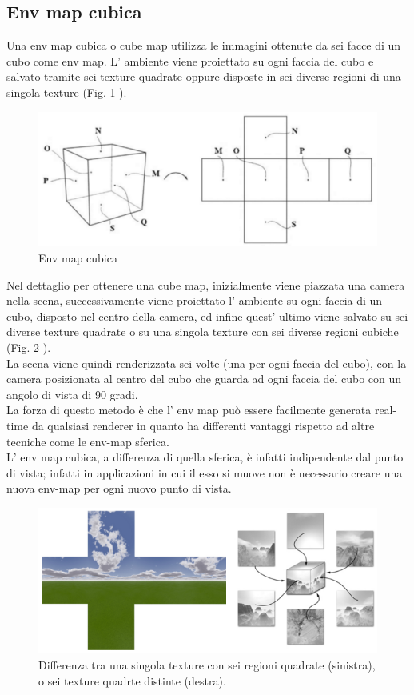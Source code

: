 \subsection{Env map cubica}
\label{sec:chapter_stato_arte_envmap_cubica}

Una env map cubica o cube map utilizza le immagini ottenute da sei facce di un cubo come env map.
L’ ambiente viene proiettato su ogni faccia del cubo e salvato tramite sei texture quadrate oppure disposte in sei diverse regioni di una singola texture (Fig. \ref{fig:stato_arte_cubo_envmap} ).
\begin{figure}[htb]
 \centering
 \includegraphics[width=0.6\linewidth]{images/chapter_stato_arte/stato_arte_cubo_envmap.png}\hfill
 \caption[Env map cubica]{Env map cubica}
 \label{fig:stato_arte_cubo_envmap}
\end{figure}
Nel dettaglio per ottenere una cube map, inizialmente viene piazzata una camera nella scena, successivamente viene proiettato l’ ambiente su ogni faccia di un cubo, disposto nel centro della camera, ed infine quest’ ultimo viene salvato su sei diverse texture quadrate o su una singola texture con sei diverse regioni cubiche (Fig. \ref{fig:stato_arte_texture_env_cubo} ).
\\
La scena viene quindi renderizzata sei volte (una per ogni faccia del cubo), con la camera posizionata al centro del cubo che guarda ad ogni faccia del cubo con un angolo di vista di 90 gradi.
\\
La forza di questo metodo è che l’ env map può essere facilmente generata real-time da qualsiasi renderer in quanto ha differenti vantaggi rispetto ad altre tecniche come le env-map sferica.
\\
L’ env map cubica, a differenza di quella sferica, è infatti indipendente dal punto di vista; infatti in applicazioni in cui il esso si muove non è necessario creare una nuova env-map per ogni nuovo punto di vista.
\begin{figure}[htb]
 \centering
 \includegraphics[width=0.9\linewidth]{images/chapter_stato_arte/stato_arte_texture_env_cubo.png}\hfill
 \caption[Env map texture]{Differenza tra una singola texture con sei regioni quadrate (sinistra), o sei texture quadrte distinte (destra).}
 \label{fig:stato_arte_texture_env_cubo}
\end{figure}